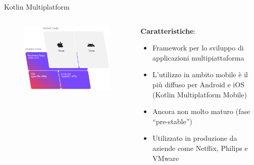 \begin{frame}{Kotlin Multiplatform}
    \begin{columns}[onlytextwidth]
        \begin{column}{0.55\textwidth}
        
             \begin{figure}[H]
                \includegraphics[width=1\textwidth]{img/kmm-stack-official.png}
            \end{figure}
            
        \end{column}
        \begin{column}{0.45\textwidth}
        
            \textbf{Caratteristiche}:
            \begin{itemize}
                \item Framework per lo sviluppo di applicazioni multipiattaforma 
                \item L'utilizzo in ambito mobile è il più diffuso per Android e iOS (Kotlin Multiplatform Mobile)
                \item Ancora non molto maturo (fase ``pre-stable'')
                \item Utilizzato in produzione da aziende come Netflix, Philips e VMware
            \end{itemize}
            
        \end{column}
    \end{columns}
\end{frame}

